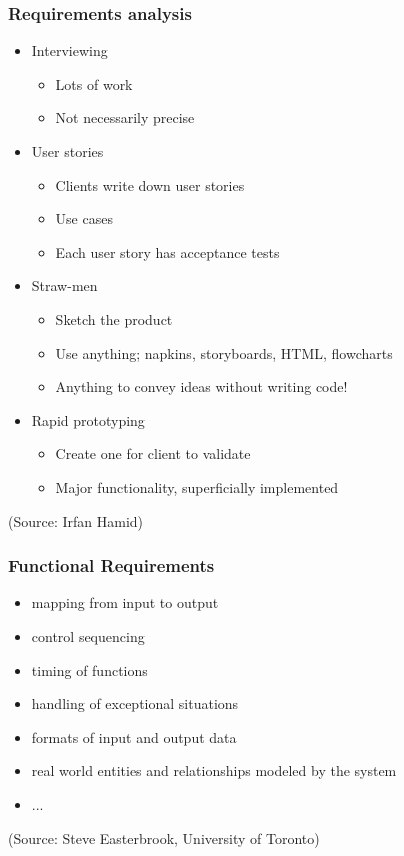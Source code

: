 \documentclass[10pt, handout]{beamer}
\begin{document}
\begin{frame}[fragile]
  \frametitle{Requirements analysis}
  \begin{itemize}
  \item Interviewing
    \begin{itemize}
    \item Lots of work
    \item Not necessarily precise
    \end{itemize}
  \item User stories
    \begin{itemize}
    \item Clients write down user stories
    \item Use cases
    \item Each user story has acceptance tests
    \end{itemize}
  \item Straw-men
    \begin{itemize}
    \item Sketch the product
    \item Use anything; napkins, storyboards, HTML, flowcharts
    \item Anything to convey ideas without writing code!
    \end{itemize}
  \item Rapid prototyping
    \begin{itemize}
    \item Create one for client to validate
    \item Major functionality, superficially implemented
    \end{itemize}
  \end{itemize}
\tiny (Source: Irfan Hamid)
\end{frame}

\begin{frame}[fragile]
  \frametitle{Functional Requirements}
  \begin{itemize}
  \item mapping from input to output
  \item control sequencing
  \item timing of functions
  \item handling of exceptional situations
  \item formats of input and output data
  \item real world entities and relationships modeled by the system
  \item ...
  \end{itemize}
\tiny (Source: Steve Easterbrook, University of Toronto)
\end{frame}
\end{document}

